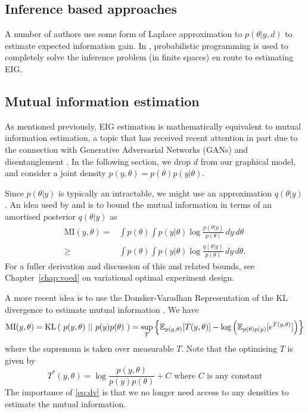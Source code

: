 \subsection{Inference based approaches}
A number of authors \cite{long2013, ryan2015} use some form of Laplace approximation to $p(\theta|y,d)$ to estimate expected information gain. In \cite{ouyang2016}, probabilistic programming is used to completely solve the inference problem (in finite spaces) en route to estimating EIG.

\subsection{Mutual information estimation}
\label{sec:mie}
As mentioned previously, EIG estimation is mathematically equivalent to mutual information estimation, a topic that has received recent attention in part due to the connection with Generative Adversarial Networks (GANs) \cite{infogan, fgan} and disentanglement \cite{tianqichen}. In the following section, we drop $d$ from our graphical model, and consider a joint density $p(y, \theta) = p(\theta)p(y|\theta)$.

Since $p(\theta|y)$ is typically an intractable, we might use an approximation $q(\theta|y)$. An idea used by \cite{ba} and \cite{infogan} is to bound the mutual information in terms of an amortised posterior $q(\theta|y)$ as
\begin{align}
	\text{MI}(y, \theta) =& \int p(\theta) \int p(y|\theta) \log \frac{p(\theta | y)}{p(\theta)} \, dy \, d\theta \\
	\ge & \int p(\theta) \int p(y|\theta) \log \frac{q(\theta | y)}{p(\theta)} \, dy \, d\theta.
\end{align}
For a fuller derivation and discussion of this and related bounds, see Chapter~\ref{chap:voed} on variational optimal experiment design.

A more recent idea is to use the Donsker-Varadhan Representation of the KL divergence to estimate mutual information \cite{mine}. We have
\begin{equation}
	\label{eq:dv}
	\text{MI}(y, \theta) = \text{KL}\left(\ p(y, \theta)\ ||\ p(y)p(\theta)\ \right) = \sup_T \left\{ \mathbb{E}_{p(y,\theta)} [T(y, \theta)] - \log\left(\mathbb{E}_{p(\theta)p(y)}[e^{T(y,\theta)}] \right)  \right\}
\end{equation}
where the supremum is taken over measurable $T$. Note that the optimising $T$ is given by
\begin{equation}
	T^*(y, \theta) = \log\frac{p(y,\theta)}{p(y)p(\theta)} + C \text{ where }C\text{ is any constant}
\end{equation}
The importance of \eqref{eq:dv} is that we no longer need access to any densities to estimate the mutual information.

